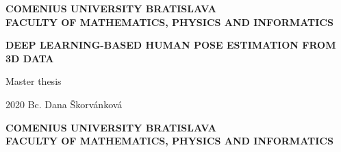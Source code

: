 \documentclass[12pt, a4paper, oneside]{book}
\newcommand\mftitle{Deep Learning-based Human Pose Estimation from 3D Data}
\newcommand\mfthesistype{Master thesis}
\newcommand\mfauthor{Bc. Dana Škorvánková}
\newcommand\mfuniversity{COMENIUS UNIVERSITY BRATISLAVA}
\newcommand\mffaculty{FACULTY OF MATHEMATICS, PHYSICS AND INFORMATICS}
\begin{document}
\frontmatter

\thispagestyle{empty}

\noindent
\begin{minipage}{\textwidth}
\begin{center}
\textbf{\mfuniversity \\
\mffaculty}
\end{center}
\end{minipage}

\vfill
\begin{center}
	\begin{minipage}{0.8\textwidth}
		\begin{center}\textbf{\Large\MakeUppercase{\mftitle}}\end{center}
		\smallskip
		\centerline{\mfthesistype}
	\end{minipage}
\end{center}
\vfill
2020 \hfill
\mfauthor
\eject 

\thispagestyle{empty}

\noindent
\begin{minipage}{\textwidth}
\begin{center}
\textbf{\mfuniversity \\
\mffaculty}
\end{center}
\end{minipage}
\end{document}
